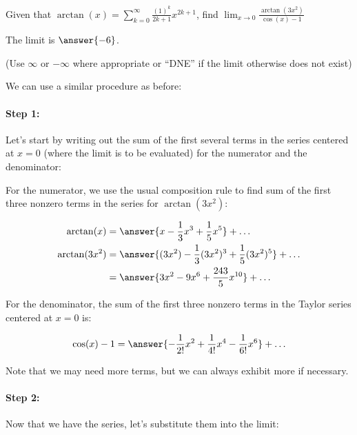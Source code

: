 \documentclass{ximera}
\author{Jim Talamo}
\begin{document}
\begin{exercise}
Given that $\arctan(x) = \sum_{k=0}^{\infty} \frac{(1)^k}{2k+1}x^{2k+1}$, find $ \lim_{x \to 0} \frac{\arctan(3x^2)}{\cos(x)-1}
$

The limit is $\answer{-6}$.

(Use $\infty$ or $-\infty$ where appropriate or ``DNE'' if the limit otherwise does not exist)

\begin{hint}
We can use a similar procedure as before:

\paragraph{Step 1:} Let's start by writing out the sum of the first several terms in the series centered at $x=0$ (where the limit is to be evaluated) for the numerator and the denominator:

\begin{question}
For the numerator, we use the usual composition rule to find sum of the first three nonzero terms in the series for $\arctan(3x^2)$:

\begin{align*}
\arctan(x) &= \answer{x-\frac{1}{3}x^3+\frac{1}{5}x^5}+\ldots \\
\arctan(3x^2) &= \answer{(3x^2)-\frac{1}{3}(3x^2)^3+\frac{1}{5}(3x^2)^5}+\ldots \\
&= \answer{3x^2-9x^6+\frac{243}{5}x^{10}}+\ldots \\
\end{align*}
\end{question}


\begin{question}
For the denominator, the sum of the first three nonzero terms in the Taylor series centered at $x=0$ is:

\[
\cos(x)-1 = \answer{-\frac{1}{2!}x^2+\frac{1}{4!}x^4-\frac{1}{6!}x^6} +\ldots
\]

\end{question}


\begin{question}
Note that we may need more terms, but we can always exhibit more if necessary.  

\paragraph{Step 2:} Now that we have the series, let's substitute them into the limit:


\end{question}
\end{hint}
\end{exercise}
\end{document}
